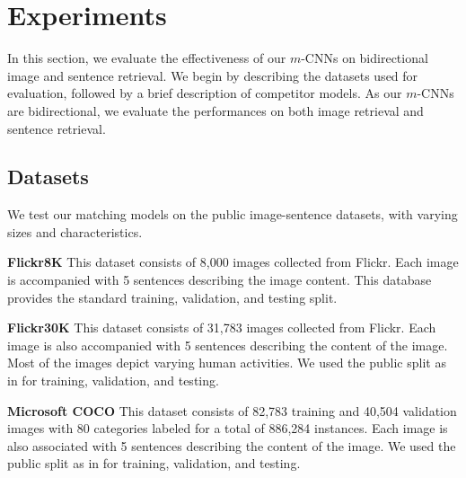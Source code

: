 \documentclass[10pt,twocolumn,letterpaper]{article}
\begin{document}
\section{Experiments}
\label{sec_experiment}


In this section, we evaluate the effectiveness of our $m$-CNNs on bidirectional image and sentence retrieval. We begin by describing the datasets used for evaluation, followed by a brief description of competitor models. As our $m$-CNNs are bidirectional, we evaluate the performances on both  image retrieval and sentence retrieval.



\subsection{Datasets}

\label{sec_setting:database}
We test our matching models on the public image-sentence datasets, with varying sizes and characteristics.

\vspace{4pt}
\noindent \textbf{Flickr8K} \cite{hodosh_jair2013}  This dataset consists of 8,000 images collected from Flickr. Each image is accompanied with 5 sentences describing the image content. This database provides the standard training, validation, and testing split.

\vspace{4pt}
\noindent \textbf{Flickr30K} \cite{young_tacl2014} This dataset  consists of 31,783 images collected from Flickr. Each image is also accompanied with 5 sentences describing the content of the image. Most of the images depict varying human activities. We used the public split as in \cite{mao_2014} for training, validation, and testing.

\vspace{4pt}
\noindent \textbf{Microsoft COCO} \cite{lin_arxiv2014} This dataset consists of 82,783 training and 40,504 validation images with 80 categories labeled for a total of 886,284 instances. Each image is also associated with 5 sentences describing the content of the image. We used the public split as in \cite{mao_iclr_2015} for training, validation, and testing.
\end{document}
